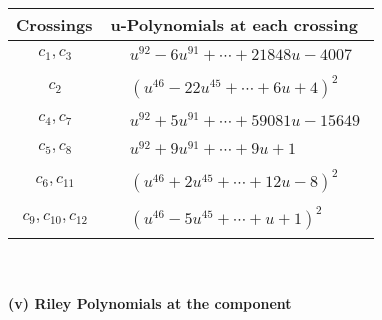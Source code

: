 \documentclass[1p]{elsarticle_modified}
\theoremstyle{definition}
\begin{document}
\begin{tabular}{m{50pt}|m{274pt}}
Crossings & \hspace{64pt}u-Polynomials at each crossing \\
\hline $$\begin{aligned}c_{1},c_{3}\end{aligned}$$&$\begin{aligned}
&u^{92}-6 u^{91}+\cdots+21848 u-4007
\end{aligned}$\\
\hline $$\begin{aligned}c_{2}\end{aligned}$$&$\begin{aligned}
&(u^{46}-22 u^{45}+\cdots+6 u+4)^{2}
\end{aligned}$\\
\hline $$\begin{aligned}c_{4},c_{7}\end{aligned}$$&$\begin{aligned}
&u^{92}+5 u^{91}+\cdots+59081 u-15649
\end{aligned}$\\
\hline $$\begin{aligned}c_{5},c_{8}\end{aligned}$$&$\begin{aligned}
&u^{92}+9 u^{91}+\cdots+9 u+1
\end{aligned}$\\
\hline $$\begin{aligned}c_{6},c_{11}\end{aligned}$$&$\begin{aligned}
&(u^{46}+2 u^{45}+\cdots+12 u-8)^{2}
\end{aligned}$\\
\hline $$\begin{aligned}c_{9},c_{10},c_{12}\end{aligned}$$&$\begin{aligned}
&(u^{46}-5 u^{45}+\cdots+u+1)^{2}
\end{aligned}$\\
\hline
\end{tabular}\\~\\
\newpage\renewcommand{\arraystretch}{1}
\flushleft \textbf{(v) Riley Polynomials at the component}\newline \\
\end{document}
